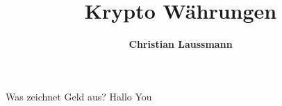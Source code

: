 \documentclass[aspectratio=169]{beamer}
\title{\textbf{\Huge Krypto Währungen}}
\author{\textcolor{secondarycolor}{\textbf{Christian Laussmann}}}
\date{}
\begin{document}
\frame{\titlepage}

\begin{frame}{Was zeichnet Geld aus?}
Hallo You
\end{frame}
\end{document}
